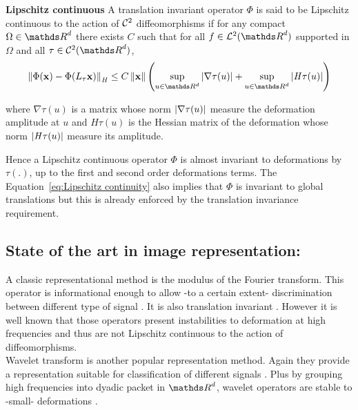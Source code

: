 \documentclass[a4paper,11pt]{report}
\begin{document}
			\begin{defn} \textbf{Lipschitz continuous}
				A translation invariant operator $\Phi$ is said to be Lipschitz continuous to the action of $\mathcal{C}^{2}$ diffeomorphisms if for any compact $\Omega \in \dsR^{d}$ there exists $C$ such that for all $f \in \mcalL^{2}(\dsR^{d})$ supported in $\Omega$ and all $\tau \in \mcalC^{2}(\dsR^{d})$,
				\begin{equation}
					\norm{\Phi(\bfx) - \Phi(L_{\tau}\bfx)}_{\mathit{H}} \leq 
					C \norm{\bfx} \left(\sup_{u \in \dsR^{d}} \abs{\nabla \tau(u)} + \sup_{u \in \dsR^{d}} \abs{\mathit{H}\tau(u)}\right)
					\label{eq:Lipschitz continuity}
				\end{equation}
				\label{pty:Lipschitz continuity - intuition}
							
				where $\nabla \tau(u)$ is a matrix whose norm $\left| \nabla \tau(u) \right|$ measure the deformation amplitude at $u$ and  $\mathit{H}\tau(u)$ is the Hessian matrix of the deformation whose norm $\left| \mathit{H}\tau(u) \right|$ measure its amplitude.
      \end{defn}
      Hence a Lipschitz continuous operator $\Phi$ is almost invariant to deformations by $\tau(.)$, up to the first and second order deformations terms. The Equation~\ref{eq:Lipschitz continuity} also implies that $\Phi$ is invariant to global translations but this is already enforced by the translation invariance requirement.\\ 

    \subsection{State of the art in image representation:}
      \label{sec:Intro/Image rep/State of the art}      
          
			A classic representational method is the modulus of the Fourier transform. This operator is informational enough to allow -to a certain extent- discrimination between different type of signal \cite{baker2014using}. It is also translation invariant \cite{bracewell1965fourier}. However it is well known that those operators present instabilities to deformation at high frequencies \cite{hormander1971fourier} and thus are not Lipschitz continuous to the action of diffeomorphisms.\\ %
      
			Wavelet transform is another popular representation method. Again they provide a representation suitable for classification of different signals \cite{de2000using}. Plus by grouping high frequencies into dyadic packet in $\dsR^{d}$, wavelet operators are stable to -small- deformations \cite{bruna2013invariant}.  %
			
\end{document}
